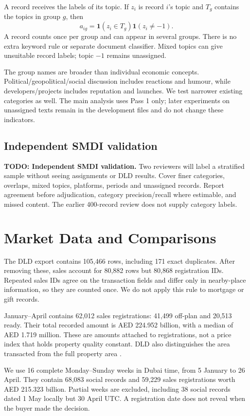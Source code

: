 \documentclass[graybox]{svmult}
\begin{document}
A record receives the labels of its topic. If $z_i$ is record $i$'s topic and $T_g$ contains the topics in group $g$, then
\begin{equation}
a_{ig}=\mathbf{1}(z_i\in T_g)\mathbf{1}(z_i\ne-1).\label{eq:assignment}
\end{equation}
A record counts once per group and can appear in several groups. There is no extra keyword rule or separate document classifier. Mixed topics can give unsuitable record labels; topic $-1$ remains unassigned.

The group names are broader than individual economic concepts. Political/geopolitical/social discussion includes reactions and humour, while developers/projects includes reputation and launches. We test narrower existing categories as well. The main analysis uses Pass 1 only; later experiments on unassigned texts remain in the development files and do not change these indicators.

\subsection{Independent SMDI validation}
\textbf{TODO: Independent SMDI validation.} Two reviewers will label a stratified sample without seeing assignments or DLD results. Cover finer categories, overlaps, mixed topics, platforms, periods and unassigned records. Report agreement before adjudication, category precision/recall where estimable, and missed content. The earlier 400-record review does not supply category labels.

\section{Market Data and Comparisons}
The DLD export contains 105,466 rows, including 171 exact duplicates. After removing these, sales account for 80,882 rows but 80,868 registration IDs. Repeated sales IDs agree on the transaction fields and differ only in nearby-place information, so they are counted once. We do not apply this rule to mortgage or gift records.

January--April contains 62,012 sales registrations: 41,499 off-plan and 20,513 ready. Their total recorded amount is AED 224.952 billion, with a median of AED 1.719 million. These are amounts attached to registrations, not a price index that holds property quality constant. DLD also distinguishes the area transacted from the full property area \cite{dlddata}.

We use 16 complete Monday--Sunday weeks in Dubai time, from 5 January to 26 April. They contain 68,083 social records and 59,229 sales registrations worth AED 215.323 billion. Partial weeks are excluded, including 38 social records dated 1 May locally but 30 April UTC. A registration date does not reveal when the buyer made the decision.
\end{document}
